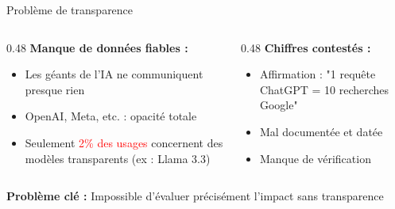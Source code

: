 \begin{frame}{Problème de transparence}

\begin{columns}
\begin{column}{0.48\textwidth}
    \textbf{Manque de données fiables :}
    \begin{itemize}
        \item Les géants de l'IA ne communiquent presque rien
        \item OpenAI, Meta, etc. : opacité totale
        \item Seulement \textcolor{red}{2\% des usages} concernent des modèles transparents (ex : Llama 3.3)
    \end{itemize}
\end{column}

\begin{column}{0.48\textwidth}
    \textbf{Chiffres contestés :}
    \begin{itemize}
        \item Affirmation : "1 requête ChatGPT = 10 recherches Google"
        \item Mal documentée et datée
        \item Manque de vérification
    \end{itemize}
\end{column}
\end{columns}

\vspace{0.5cm}

\textbf{Problème clé :} Impossible d'évaluer précisément l'impact sans transparence

\end{frame}


